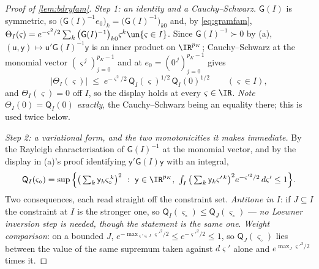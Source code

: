 \begin{proof}[Proof of \cref{lem:bdryfam}]
\emph{Step 1: an identity and a Cauchy--Schwarz.} $\mathsf G(I)$ is symmetric, so
$\big(\mathsf G(I)^{-1}e_0\big)_k=\big(\mathsf G(I)^{-1}\big)_{k0}$ and, by \eqref{eq:gramfam},
$\Theta_I(\varsigma)=e^{-\varsigma^{2}/2}\sum_k\big(\mathsf G(I)^{-1}\big)_{k0}\varsigma^{k}\un\{\varsigma\in I\}$.
Since $\mathsf G(I)^{-1}\succ0$ by (a), $(\mathsf u,\mathsf y)\mapsto\mathsf u'\mathsf G(I)^{-1}\mathsf y$
is an inner product on $\IR^{p_K}$; Cauchy--Schwarz at the monomial vector
$(\varsigma^{\,j})_{j=0}^{p_K-1}$ and at $e_0=(0^{\,j})_{j=0}^{p_K-1}$ gives
\begin{equation*}
\big|\Theta_I(\varsigma)\big|\;\le\;e^{-\varsigma^{2}/2}\,\mathsf Q_I(\varsigma)^{1/2}\,\mathsf Q_I(0)^{1/2}
\qquad(\varsigma\in I),
\end{equation*}
and $\Theta_I(\varsigma)=0$ off $I$, so the display holds at every $\varsigma\in\IR$. \emph{Note
$\Theta_I(0)=\mathsf Q_I(0)$ exactly}, the Cauchy--Schwarz being an equality there; this is used twice
below.

\emph{Step 2: a variational form, and the two monotonicities it makes immediate.} By the Rayleigh
characterisation of $\mathsf G(I)^{-1}$ at the monomial vector, and by the display in (a)'s proof
identifying $\mathsf y'\mathsf G(I)\mathsf y$ with an integral,
\begin{equation*}
\mathsf Q_I(\varsigma_\circ)
=\sup\Big\{\big(\textstyle\sum_k\mathsf y_k\varsigma_\circ^{\,k}\big)^{2}\ :\
\mathsf y\in\IR^{p_K},\ \int_I\big(\textstyle\sum_k\mathsf y_k\varsigma'^{\,k}\big)^{2}
e^{-\varsigma'^{2}/2}\,d\varsigma'\le1\Big\} .
\end{equation*}
Two consequences, each read straight off the constraint set. \emph{Antitone in $I$}: if $J\subseteq I$
the constraint at $I$ is the stronger one, so $\mathsf Q_I(\varsigma_\circ)\le\mathsf Q_J(\varsigma_\circ)$
--- \emph{no Loewner inversion step is needed, though the statement is the same one}. \emph{Weight
comparison}: on a bounded $J$, $e^{-\max_{\varsigma'\in J}\varsigma'^{2}/2}\le e^{-\varsigma'^{2}/2}\le1$,
so $\mathsf Q_J(\varsigma_\circ)$ lies between the value of the same supremum taken against
$d\varsigma'$ alone and $e^{\max_{J}\varsigma'^{2}/2}$ times it.


\end{proof}
